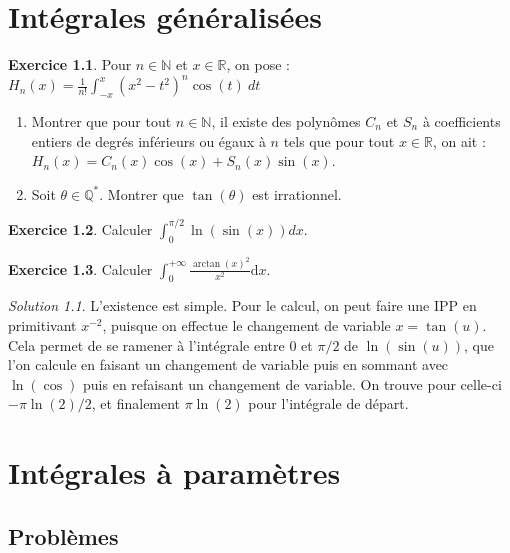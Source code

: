 \documentclass[french]{book}
\newcommand{\N}{\mathbb{N}}
\newcommand{\Q}{\mathbb{Q}}
\newcommand{\R}{\mathbb{R}}
\newcommand{\st}{^*}
\theoremstyle{definition}
\newtheorem{ex}{Exercice}[chapter]
\theoremstyle{remark}
\newtheorem*{sol}{Solution}
\begin{document}
\chapter{Intégrales généralisées}

\begin{ex}
	Pour $n\in\N$ et $x\in\R$, on pose : $H_n(x)=\displaystyle\frac{1}{n!}\int_{-x}^{x}(x^2-t^2)^n\cos(t)\ dt$
	\begin{enumerate}
		\item Montrer que pour tout $n\in\N$, il existe des polynômes $C_n$ et $S_n$ à coefficients entiers de degrés inférieurs ou égaux à $n$ tels que pour tout $x\in\R$, on ait : $H_n(x)=C_n(x)\cos(x)+S_n(x)\sin(x)$.
		\item Soit $\theta\in\Q\st$. Montrer que $\tan(\theta)$ est irrationnel.
	\end{enumerate}
\end{ex}

\begin{ex}
	Calculer $\displaystyle\int_{0}^{\pi/2}\ln(\sin(x))dx$.
\end{ex}

\begin{ex}
	Calculer $\displaystyle\int_{0}^{+\infty}\frac{\arctan(x)^2}{x^2}\text{d}x$.
\end{ex}
\begin{sol}
	L'existence est simple. Pour le calcul, on peut faire une IPP en primitivant $x^{-2}$, puisque on effectue le changement de variable $x=\tan(u)$. Cela permet de se ramener à l'intégrale entre $0$ et $\pi/2$ de $\ln(\sin(u))$, que l'on calcule en faisant un changement de variable puis en sommant avec $\ln(\cos)$ puis en refaisant un changement de variable. On trouve pour celle-ci $-\pi\ln(2)/2$, et finalement $\pi\ln(2)$ pour l'intégrale de départ.
\end{sol}

\chapter{Intégrales à paramètres}

\section{Problèmes}
\end{document}
